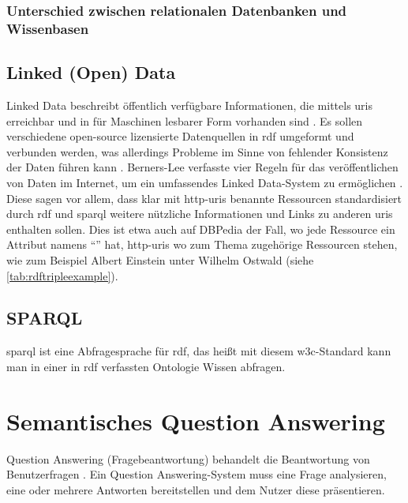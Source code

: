 \subsubsection{Unterschied zwischen relationalen Datenbanken und Wissenbasen}



\subsection{Linked (Open) Data}

Linked Data beschreibt öffentlich verfügbare Informationen, die mittels \acp{uri} erreichbar und in für Maschinen lesbarer Form vorhanden sind \citep{linkeddata}.
Es sollen verschiedene open-source lizensierte Datenquellen in \ac{rdf} umgeformt und verbunden werden, was allerdings Probleme im Sinne von fehlender Konsistenz der Daten führen kann \citep{semanticwebreview}.
Berners-Lee verfasste vier Regeln für das veröffentlichen von Daten im Internet, um ein umfassendes Linked Data-System zu ermöglichen \citep{linkeddatadesignissues}.
Diese sagen vor allem, dass klar mit \ac{http}-\acp{uri} benannte Ressourcen standardisiert durch \ac{rdf} und \ac{sparql} weitere nützliche Informationen und Links zu anderen \acp{uri} enthalten sollen.
Dies ist etwa auch auf DBPedia der Fall, wo jede Ressource ein Attribut namens \enquote{} hat, \ac{http}-\acp{uri} wo zum Thema zugehörige Ressourcen stehen,
wie zum Beispiel Albert Einstein unter Wilhelm Ostwald (siehe \cref{tab:rdftripleexample}).

\subsection{SPARQL}

\ac{sparql} ist eine Abfragesprache für \ac{rdf}, das heißt mit diesem \ac{w3c}-Standard kann man in einer in \ac{rdf} verfassten Ontologie Wissen abfragen.
\section{Semantisches Question Answering}

\begin{definition}
Question Answering (Fragebeantwortung) behandelt die Beantwortung von Benutzerfragen \citep{qadefinition}.
Ein Question Answering-System muss eine Frage analysieren, eine oder mehrere Antworten bereitstellen und dem Nutzer diese präsentieren.
\end{definition}

